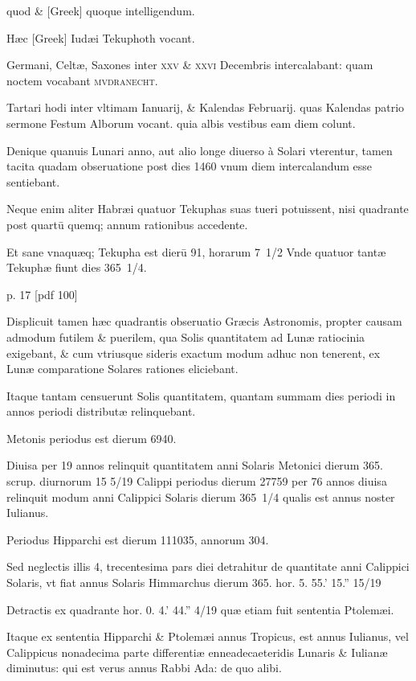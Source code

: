 quod \& \textgreek{[Greek]} quoque intelligendum.

Hæc \textgreek{[Greek]} Iudæi Tekuphoth vocant.

Germani, Celtæ,
Saxones inter \textsc{xxv \& xxvi} Decembris intercalabant: quam noctem
vocabant \textsc{mvdranecht}.

Tartari hodi inter vltimam Ianuarij,
\& Kalendas Februarij. quas Kalendas patrio sermone Festum Alborum
vocant. quia albis vestibus eam diem colunt.

Denique quanuis
Lunari anno, aut alio longe diuerso à Solari vterentur, tamen tacita
quadam obseruatione post dies 1460 vnum diem intercalandum esse
sentiebant.

Neque enim aliter Habræi quatuor Tekuphas suas tueri
potuissent, nisi quadrante post quartū quemq; annum rationibus accedente.

Et sane vnaquæq; Tekupha est dierū 91, horarum 7 1/2 Vnde
quatuor tantæ Tekuphæ fiunt dies 365 1/4.



p. 17 [pdf 100]


Displicuit tamen hæc quadrantis
obseruatio Græcis Astronomis, propter causam admodum futilem
\& puerilem, qua Solis quantitatem ad Lunæ ratiocinia exigebant,
\& cum vtriusque sideris exactum modum adhuc non tenerent,
ex Lunæ comparatione Solares rationes eliciebant.

Itaque tantam
censuerunt Solis quantitatem, quantam summam dies periodi in annos
periodi distributæ relinquebant.

Metonis periodus est dierum
6940.

Diuisa per 19 annos relinquit quantitatem anni Solaris Metonici
dierum 365. scrup. diurnorum 15 5/19 Calippi periodus dierum
27759 per 76 annos diuisa relinquit modum anni Calippici Solaris
dierum 365 1/4 qualis est annus noster Iulianus.

Periodus Hipparchi
est dierum 111035, annorum 304.

Sed neglectis illis 4,
trecentesima pars diei detrahitur de quantitate anni Calippici Solaris,
vt fiat annus Solaris Himmarchus
 dierum 365. hor. 5. 55.' 15.'' 15/19

Detractis ex quadrante hor. 0. 4.' 44.'' 4/19 quæ etiam fuit sententia
Ptolemæi.

Itaque ex sententia Hipparchi \& Ptolemæi annus
Tropicus, est annus Iulianus, vel Calippicus nonadecima parte
differentiæ enneadecaeteridis Lunaris \& Iulianæ diminutus: qui
est verus annus Rabbi Ada: de quo alibi.

